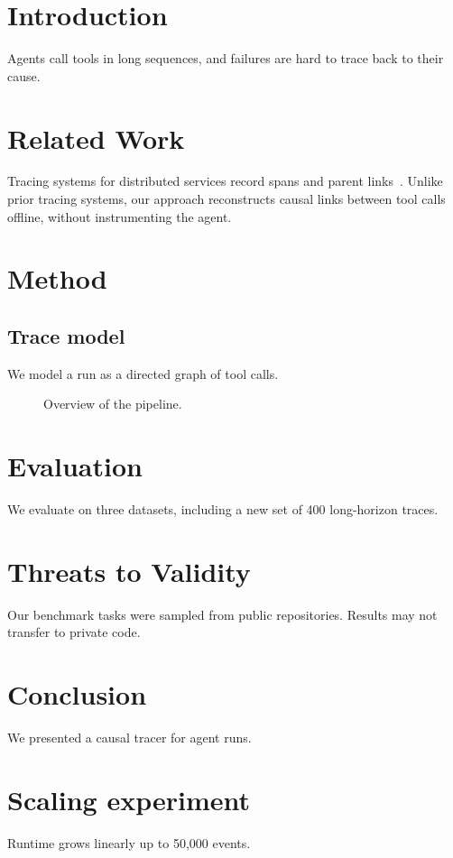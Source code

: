 \documentclass{article}
\begin{document}
\section{Introduction}
Agents call tools in long sequences, and failures are hard to trace back to their cause.

\section{Related Work}
Tracing systems for distributed services record spans and parent links~\cite{dapper}.
Unlike prior tracing systems, our approach reconstructs causal links between tool calls offline,
without instrumenting the agent.

\section{Method}
\subsection{Trace model}
We model a run as a directed graph of tool calls.
\begin{figure}
  \centering
  \caption{Overview of the pipeline.}
  \label{fig:overview}
\end{figure}

\section{Evaluation}
We evaluate on three datasets, including a new set of 400 long-horizon traces.
\begin{table}\caption{Datasets.}\label{tab:data}\end{table}
\begin{table}\caption{Main results.}\label{tab:main}\end{table}
\begin{table}\caption{Ablation of the retrieval component.}\label{tab:ablation}\end{table}

\section{Threats to Validity}
Our benchmark tasks were sampled from public repositories. Results may not transfer to private code.

\section{Conclusion}
We presented a causal tracer for agent runs.

\appendix
\section{Scaling experiment}
Runtime grows linearly up to 50,000 events.
\end{document}
